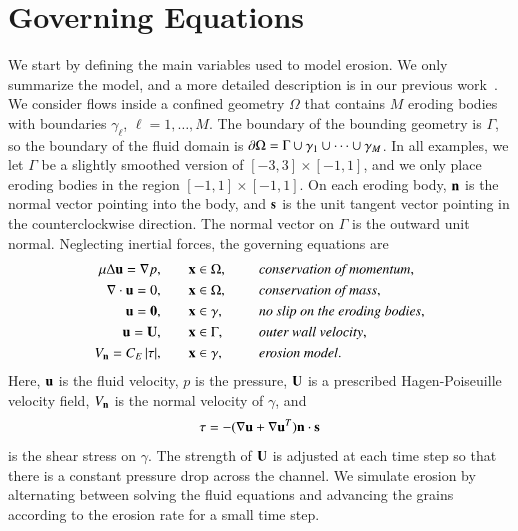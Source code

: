 \documentclass[preprint,10pt]{elsarticle}
\begin{document}
\section{Governing Equations}
\label{sec:formulation}
We start by defining the main variables used to model erosion.  We only
summarize the model, and a more detailed description is in our previous
work~\cite{qua-moo2018}.  We consider flows inside a confined geometry
$\Omega$ that contains $M$ eroding bodies with boundaries $\gamma_\ell$,
$\ell = 1,\ldots,M$.  The boundary of the bounding geometry is $\Gamma$,
so the boundary of the fluid domain is $\bd \Omega = \Gamma \cup
\gamma_1 \cup \cdots \cup \gamma_M$.  In all examples, we let $\Gamma$
be a slightly smoothed version of $[-3,3] \times [-1,1]$, and we only
place eroding bodies in the region $[-1,1] \times [-1,1]$.  On each
eroding body, $\nn$ is the normal vector pointing into the body, and
$\ss$ is the unit tangent vector pointing in the counterclockwise
direction.  The normal vector on $\Gamma$ is the outward unit normal.
Neglecting inertial forces, the governing equations are
\begin{equation}
\label{eqn:erosionModel}
  \begin{split}
    \mu \Delta \uu = \grad p, &\hspace{20pt} \xx \in \Omega, \gap 
      &&\mbox{\em conservation of momentum}, \\
    \grad \cdot \uu = 0, &\hspace{20pt} \xx \in \Omega, \gap 
      &&\mbox{\em conservation of mass}, \\
    \uu = \mathbf{0}, &\hspace{20pt} \xx \in \gamma, \gap 
      &&\mbox{\em no slip on the eroding bodies}, \\
    \uu = \UU, &\hspace{20pt} \xx \in \Gamma, \gap 
      &&\mbox{\em outer wall velocity}, \\
    \Vn = \CE \, \abs{\tau}, &\hspace{20pt} \xx \in \gamma,
      &&\mbox{\em erosion model}.
  \end{split}
\end{equation}
Here, $\uu$ is the fluid velocity, $p$ is the pressure, $\UU$ is a
prescribed Hagen-Poiseuille velocity field, $\Vn$ is the normal velocity
of $\gamma$, and
\begin{align}
  \tau = -(\nabla \uu + \nabla \uu^T) \nn \cdot \ss
  \label{eqn:shearStress}
\end{align}
is the shear stress on $\gamma$.  The strength of $\UU$ is adjusted at
each time step so that there is a constant pressure drop across the
channel.  We simulate erosion by alternating between solving the fluid
equations and advancing the grains according to the erosion rate for a
small time step.
\end{document}

